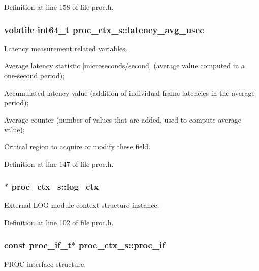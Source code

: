 Definition at line 158 of file proc.\+h.

\subsubsection[{\texorpdfstring{latency\+\_\+avg\+\_\+usec}{latency_avg_usec}}]{\setlength{\rightskip}{0pt plus 5cm}volatile int64\+\_\+t proc\+\_\+ctx\+\_\+s\+::latency\+\_\+avg\+\_\+usec}\hypertarget{structproc__ctx__s_acdd3cc73dadcf7eb7c70c6e5ffb53293}{}\label{structproc__ctx__s_acdd3cc73dadcf7eb7c70c6e5ffb53293}
Latency measurement related variables.
\begin{DoxyItemize}
\item Average latency statistic \mbox{[}microseconds/second\mbox{]} (average value computed in a one-\/second period);
\item Accumulated latency value (addition of individual frame latencies in the average period);
\item Average counter (number of values that are added, used to compute average value);
\item Critical region to acquire or modify these field. 
\end{DoxyItemize}

Definition at line 147 of file proc.\+h.

\subsubsection[{\texorpdfstring{log\+\_\+ctx}{log_ctx}}]{$\ast$ proc\+\_\+ctx\+\_\+s\+::log\+\_\+ctx}\hypertarget{structproc__ctx__s_a7c58dee78b4d7834e4c2fe430cd267d5}{}\label{structproc__ctx__s_a7c58dee78b4d7834e4c2fe430cd267d5}
External L\+OG module context structure instance. 

Definition at line 102 of file proc.\+h.

\subsubsection[{\texorpdfstring{proc\+\_\+if}{proc_if}}]{\setlength{\rightskip}{0pt plus 5cm}const {\bf proc\+\_\+if\+\_\+t}$\ast$ proc\+\_\+ctx\+\_\+s\+::proc\+\_\+if}\hypertarget{structproc__ctx__s_ae63f720fef21f807ed42fe76806140f6}{}\label{structproc__ctx__s_ae63f720fef21f807ed42fe76806140f6}
P\+R\+OC interface structure. 

